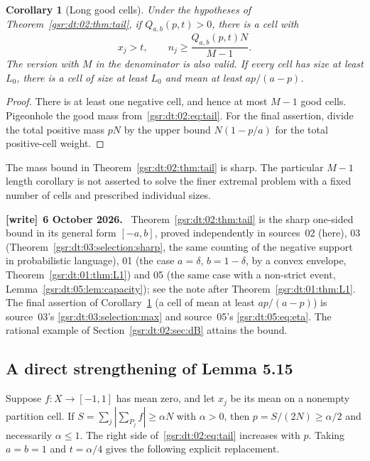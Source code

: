 \documentclass[11pt,letterpaper]{article}
\numberwithin{equation}{section}
\newtheorem{corollary}[theorem]{Corollary}
\theoremstyle{definition}
\theoremstyle{remark}
\newcommand{\1}{\mathbf 1}
\newenvironment{writenote}[1][]{\par\smallskip\begingroup\small
 \noindent\textbf{[write]}\if\relax\detokenize{#1}\relax\else~\textbf{#1.}\fi\ }%
 {\par\endgroup\smallskip}
\begin{document}
\begin{corollary}[Long good cells]\label{gsr:dt:02:cor:long}
Under the hypotheses of Theorem~\ref{gsr:dt:02:thm:tail}, if $Q_{a,b}(p,t)>0$, there is a cell with
\[
 x_j>t,\qquad n_j\geq\frac{Q_{a,b}(p,t)N}{M-1}.
\]
The version with $M$ in the denominator is also valid. If every cell has size at least $L_0$, there is a cell of size at least $L_0$ and mean at least $ap/(a-p)$.
\end{corollary}
\begin{proof}
There is at least one negative cell, and hence at most $M-1$ good cells. Pigeonhole the good mass from~\eqref{gsr:dt:02:eq:tail}. For the final assertion, divide the total positive mass $pN$ by the upper bound $N(1-p/a)$ for the total positive-cell weight.
\end{proof}

The mass bound in Theorem~\ref{gsr:dt:02:thm:tail} is sharp. The particular $M-1$ length corollary is not asserted to solve the finer extremal problem with a fixed number of cells and prescribed individual sizes.
\begin{writenote}[6 October 2026]
Theorem~\ref{gsr:dt:02:thm:tail} is the sharp one-sided bound in its general form $[-a,b]$, proved independently in sources~02 (here), 03 (Theorem~\ref{gsr:dt:03:selection:sharp}, the same counting of the negative support in probabilistic language), 01 (the case $a=\delta$, $b=1-\delta$, by a convex envelope, Theorem~\ref{gsr:dt:01:thm:L1}) and 05 (the same case with a non-strict event, Lemma~\ref{gsr:dt:05:lem:capacity}); see the note after Theorem~\ref{gsr:dt:01:thm:L1}. The final assertion of Corollary~\ref{gsr:dt:02:cor:long} (a cell of mean at least $ap/(a-p)$) is source~03's \eqref{gsr:dt:03:selection:max} and source~05's \eqref{gsr:dt:05:eq:eta}. The rational example of Section~\ref{gsr:dt:02:sec:dB} attains the bound.
\end{writenote}

\subsection{A direct strengthening of Lemma 5.15}
Suppose $f:X\to[-1,1]$ has mean zero, and let $x_j$ be its mean on a nonempty partition cell. If $S=\sum_j|\sum_{P_j}f|\geq\alpha N$ with $\alpha>0$, then $p=S/(2N)\geq\alpha/2$ and necessarily $\alpha\leq1$. The right side of~\eqref{gsr:dt:02:eq:tail} increases with $p$. Taking $a=b=1$ and $t=\alpha/4$ gives the following explicit replacement.
\end{document}
